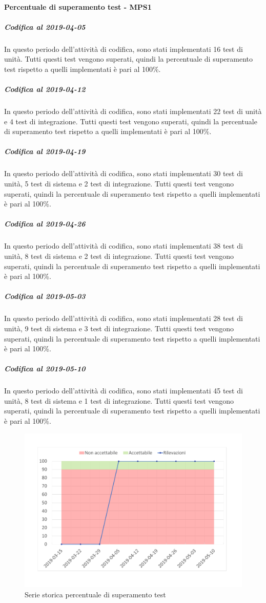 \paragraph{Percentuale di superamento test - MPS1}
\subparagraph{Codifica al 2019-04-05}
In questo periodo dell'attività di codifica, sono stati implementati 16 test di unità. Tutti questi test vengono superati, quindi la percentuale di superamento test rispetto a quelli implementati è pari al 100\%.

\subparagraph{Codifica al 2019-04-12}
In questo periodo dell'attività di codifica, sono stati implementati 22 test di unità e 4 test di integrazione. Tutti questi test vengono superati, quindi la percentuale di superamento test rispetto a quelli implementati è pari al 100\%.

\subparagraph{Codifica al 2019-04-19}
In questo periodo dell'attività di codifica, sono stati implementati 30 test di unità, 5 test di sistema e 2 test di integrazione. Tutti questi test vengono superati, quindi la percentuale di superamento test rispetto a quelli implementati è pari al 100\%.

\subparagraph{Codifica al 2019-04-26}
In questo periodo dell'attività di codifica, sono stati implementati 38 test di unità, 8 test di sistema e 2 test di integrazione. Tutti questi test vengono superati, quindi la percentuale di superamento test rispetto a quelli implementati è pari al 100\%.


\subparagraph{Codifica al 2019-05-03}
In questo periodo dell'attività di codifica, sono stati implementati 28 test di unità, 9 test di sistema e 3 test di integrazione. Tutti questi test vengono superati, quindi la percentuale di superamento test rispetto a quelli implementati è pari al 100\%.

\subparagraph{Codifica al 2019-05-10}
In questo periodo dell'attività di codifica, sono stati implementati 45 test di unità, 8 test di sistema e 1 test di integrazione. Tutti questi test vengono superati, quindi la percentuale di superamento test rispetto a quelli implementati è pari al 100\%.


\begin{figure}[H]
	\centering
	\includegraphics[scale=0.6]{images/resoconto/MPS1Chart.pdf}
	\caption{Serie storica percentuale di superamento test}	
\end{figure}

